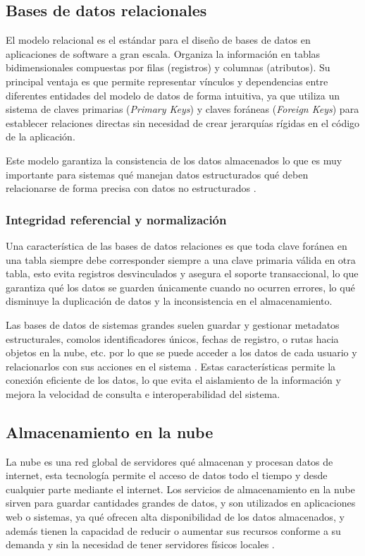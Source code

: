\subsection{Bases de datos relacionales}
\label{sec:marco_teorico_tema5}
El modelo relacional es el estándar para el diseño de bases de datos en aplicaciones de software a gran escala. Organiza la información en tablas bidimensionales compuestas por filas (registros) y columnas (atributos). Su principal ventaja es que permite representar vínculos y dependencias entre diferentes entidades del modelo de datos de forma intuitiva, ya que utiliza un sistema de claves primarias (\textit{Primary Keys}) y claves foráneas (\textit{Foreign Keys}) para establecer relaciones directas sin necesidad de crear jerarquías rígidas en el código de la aplicación. 

Este modelo garantiza la consistencia de los datos almacenados lo que es muy importante para sistemas qué manejan datos estructurados qué deben relacionarse de forma precisa con datos no estructurados \cite{camavilca2025inteligencia}.
\subsubsection{Integridad referencial y normalización}
Una característica de las bases de datos relaciones es que toda clave foránea en una tabla siempre debe corresponder siempre a una clave primaria válida en otra tabla, esto evita registros desvinculados y asegura el soporte transaccional, lo que garantiza qué los datos se guarden únicamente cuando no ocurren errores, lo qué disminuye la duplicación de datos y la inconsistencia en el almacenamiento. 

Las bases de datos de sistemas grandes suelen guardar y gestionar metadatos estructurales, comolos identificadores únicos, fechas de registro, o rutas hacia objetos en la nube, etc. por lo que se puede acceder a los datos de cada usuario y relacionarlos con sus acciones en el sistema \cite{camavilca2025inteligencia}. Estas características permite la conexión eficiente de los datos, lo que evita el aislamiento de la información y mejora la velocidad de consulta e interoperabilidad del sistema.

\subsection{Almacenamiento en la nube}
\label{sec:marco_teorico_tema6}
La nube es una red global de servidores qué almacenan y procesan datos de internet, esta tecnología permite el acceso de datos todo el tiempo y desde cualquier parte mediante el internet. Los servicios de almacenamiento en la nube sirven para guardar cantidades grandes de datos, y son utilizados en aplicaciones web o sistemas, ya qué ofrecen alta disponibilidad de los datos almacenados, y además tienen la capacidad de reducir o aumentar sus recursos conforme a su demanda y sin la necesidad de tener servidores físicos locales \cite{almaceamientoNube2024, aguilar2023caracteristicas}.

